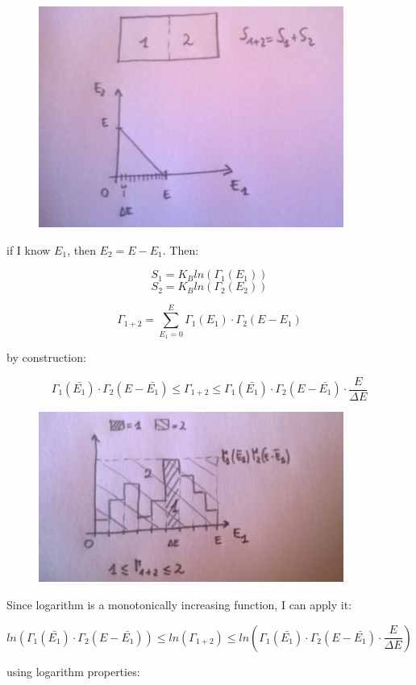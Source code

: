\documentclass[a4paper, italian, openany]{book}
\begin{document}
\begin{figure}[H]
\centering
\includegraphics[width=100mm]{img/figure4.jpg}
\end{figure}

if I know $E_1$, then $E_2 = E- E_1$. Then:

$$S_1 = K_B ln(\Gamma_1(E_1))$$
$$S_2 = K_B ln(\Gamma_2(E_2))$$

$$\Gamma_{1+2} = \sum_{E_1=0}^{E} \Gamma_1(E_1) \cdot \Gamma_2(E-E_1)$$

by construction:

$$\Gamma_1(\bar{E_1})\cdot \Gamma_2(E- \bar{E_1}) \le \Gamma_{1+2} \le \Gamma_1(\bar{E_1})\cdot \Gamma_2(E-\bar{E_1}) \cdot \frac{E}{\Delta E}$$

\begin{figure}[H]
\centering
\includegraphics[width=100mm]{img/figure5.jpg}
\end{figure}

Since logarithm is a monotonically increasing function, I can apply it:

$$ln(\Gamma_1(\bar{E_1})\cdot \Gamma_2(E- \bar{E_1})) \le ln(\Gamma_{1+2}) \le ln(\Gamma_1(\bar{E_1})\cdot \Gamma_2(E-\bar{E_1}) \cdot \frac{E}{\Delta E})$$

using logarithm properties:
\end{document}
